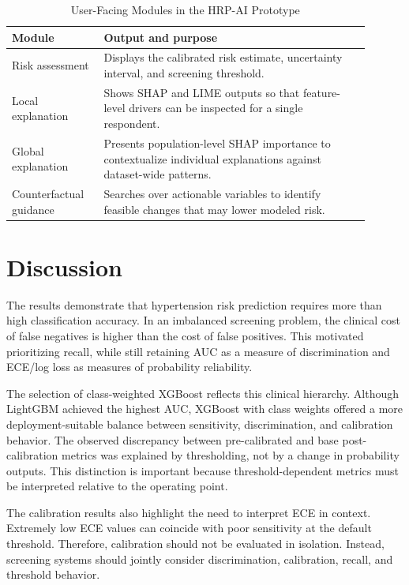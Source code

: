 \documentclass[journal]{IEEEtran}
\begin{document}
\begin{table}[!t]
\caption{User-Facing Modules in the HRP-AI Prototype}
\label{tab:webmodules}
\centering
\footnotesize
\begin{tabular}{p{0.23\linewidth}p{0.67\linewidth}}
\toprule
Module & Output and purpose\\
\midrule
Risk assessment & Displays the calibrated risk estimate, uncertainty interval, and screening threshold.\\
Local explanation & Shows SHAP and LIME outputs so that feature-level drivers can be inspected for a single respondent.\\
Global explanation & Presents population-level SHAP importance to contextualize individual explanations against dataset-wide patterns.\\
Counterfactual guidance & Searches over actionable variables to identify feasible changes that may lower modeled risk.\\
\bottomrule
\end{tabular}
\end{table}

\section{Discussion}
The results demonstrate that hypertension risk prediction requires more than high classification accuracy. In an imbalanced screening problem, the clinical cost of false negatives is higher than the cost of false positives. This motivated prioritizing recall, while still retaining AUC as a measure of discrimination and ECE/log loss as measures of probability reliability.

The selection of class-weighted XGBoost reflects this clinical hierarchy. Although LightGBM achieved the highest AUC, XGBoost with class weights offered a more deployment-suitable balance between sensitivity, discrimination, and calibration behavior. The observed discrepancy between pre-calibrated and base post-calibration metrics was explained by thresholding, not by a change in probability outputs. This distinction is important because threshold-dependent metrics must be interpreted relative to the operating point.

The calibration results also highlight the need to interpret ECE in context. Extremely low ECE values can coincide with poor sensitivity at the default threshold. Therefore, calibration should not be evaluated in isolation. Instead, screening systems should jointly consider discrimination, calibration, recall, and threshold behavior.
\end{document}
